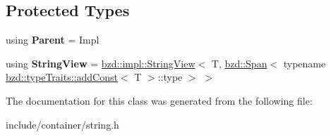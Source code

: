\subsection*{Protected Types}
\begin{DoxyCompactItemize}
\item 
\mbox{\label{classbzd_1_1impl_1_1String_acfcfea3798d5426c5fd397af23f5937d}} 
using {\bfseries Parent} = Impl
\item 
\mbox{\label{classbzd_1_1impl_1_1String_ae297aad5c516ea52e890864515af9dfa}} 
using {\bfseries String\+View} = \hyperlink{classbzd_1_1impl_1_1StringView}{bzd\+::impl\+::\+String\+View}$<$ T, \hyperlink{classbzd_1_1Span}{bzd\+::\+Span}$<$ typename \hyperlink{structbzd_1_1typeTraits_1_1addConst}{bzd\+::type\+Traits\+::add\+Const}$<$ T $>$\+::type $>$ $>$
\end{DoxyCompactItemize}


The documentation for this class was generated from the following file\+:\begin{DoxyCompactItemize}
\item 
include/container/string.\+h\end{DoxyCompactItemize}
